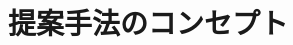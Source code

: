 \documentclass[../main]{subfiles}
\begin{document}
\section{提案手法のコンセプト}
\label{sec:pmethod_concept}
\end{document}
